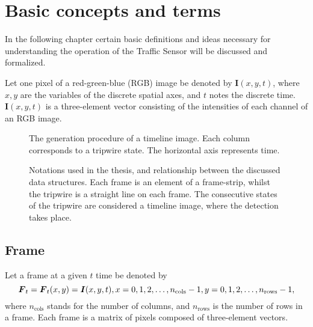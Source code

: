 \chapter{Basic concepts and terms}\label{chap:Concepts}
In the following chapter certain basic definitions and ideas necessary for understanding the operation of the Traffic Sensor will be discussed and formalized.

Let one pixel of a red-green-blue (RGB) image be denoted by $\boldsymbol{I}(x,y,t)$, where $x, y$ are the variables of the discrete spatial axes, and $t$ notes the discrete time.
$\boldsymbol{I}(x,y,t)$ is a three-element vector consisting of the intensities of each channel of an RGB image.
\begin{figure}[bh]
	\centering
	\scalebox{.7}{}
	\label{fig:TI_creation}
	\caption{The generation procedure of a timeline image. Each column corresponds to a tripwire state. The horizontal axis represents time.}
\end{figure}
\begin{figure}[h!]
	\centering
	\scalebox{.7}{}
	\label{fig:notations}
	\caption{Notations used in the thesis, and relationship between the discussed data structures. Each frame is an element of a frame-strip, whilst the tripwire is a straight line on each frame. The consecutive states of the tripwire are considered a timeline image, where the detection takes place.}
\end{figure}
\section{Frame}
Let a frame at a given $t$ time be denoted by
\begin{displaymath}
	\boldsymbol{F}_t=\boldsymbol{F}_t(x,y)=\boldsymbol{I}(x,y,t),\\
	x=0,1,2,\dotsc,n_{\text{cols}}-1,\\
	y=0,1,2,\dotsc,n_{\text{rows}}-1,
\end{displaymath}
where $n_{\text{cols}}$ stands for the number of columns, and $n_{\text{rows}}$ is the number of rows in a frame.
Each frame is a matrix of pixels composed of three-element vectors. 

